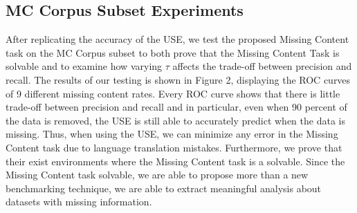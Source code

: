\documentclass[11pt]{article}
\begin{document}


\subsection{MC Corpus Subset Experiments}
After replicating the accuracy of the USE, we test the proposed Missing Content task on the MC Corpus subset to both prove that the Missing Content Task is solvable and to examine how varying $\tau$ affects the trade-off between precision and recall. The results of our testing is shown in Figure 2, displaying the ROC curves of 9 different missing content rates. Every ROC curve shows that there is little trade-off between precision and recall and in particular, even when 90 percent of the data is removed, the USE is still able to accurately predict when the data is missing. Thus, when using the USE, we can minimize any error in the Missing Content task due to language translation mistakes. Furthermore, we prove that their exist environments where the Missing Content task is a solvable. Since the Missing Content task solvable, we are able to propose more than a new benchmarking technique, we are able to extract meaningful analysis about datasets with missing information. 

\end{document}
